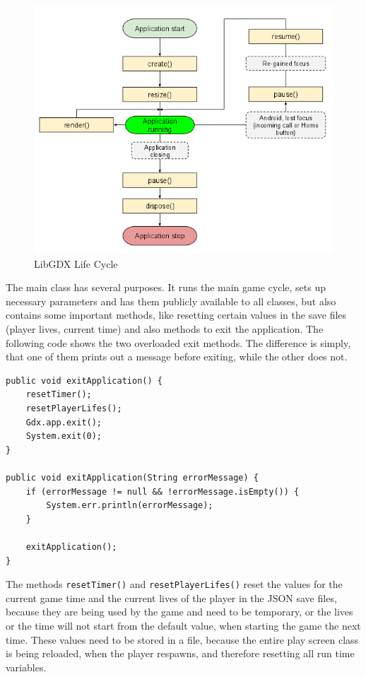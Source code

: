 \documentclass[12p]{article}
\begin{document}
\begin{figure}[ht]
    \center
    \includegraphics[width=1\textwidth]{Documentation/lifeCycle}
    \caption{LibGDX Life Cycle \cite{libGDXLifeCycle}}
    \label{fig:LibGDXLifeCycle}
\end{figure}

The main class has several purposes. It runs the main game cycle, sets up necessary parameters and has them publicly available to all classes, but also contains some important methods, like resetting certain values in the save files (player lives, current time) and also methods to exit the application. The following code shows the two overloaded exit methods. The difference is simply, that one of them prints out a message before exiting, while the other does not.

\begin{verbatim}
public void exitApplication() {
	resetTimer();
	resetPlayerLifes();
	Gdx.app.exit();
	System.exit(0);
}

public void exitApplication(String errorMessage) {
	if (errorMessage != null && !errorMessage.isEmpty()) {
		System.err.println(errorMessage);
	}

	exitApplication();
}
\end{verbatim}

The methods \texttt{resetTimer()} and \texttt{resetPlayerLifes()} reset the values for the current game time and the current lives of the player in the JSON save files, because they are being used by the game and need to be temporary, or the lives or the time will not start from the default value, when starting the game the next time. These values need to be stored in a file, because the entire play screen class is being reloaded, when the player respawns, and therefore resetting all run time variables.
\end{document}
